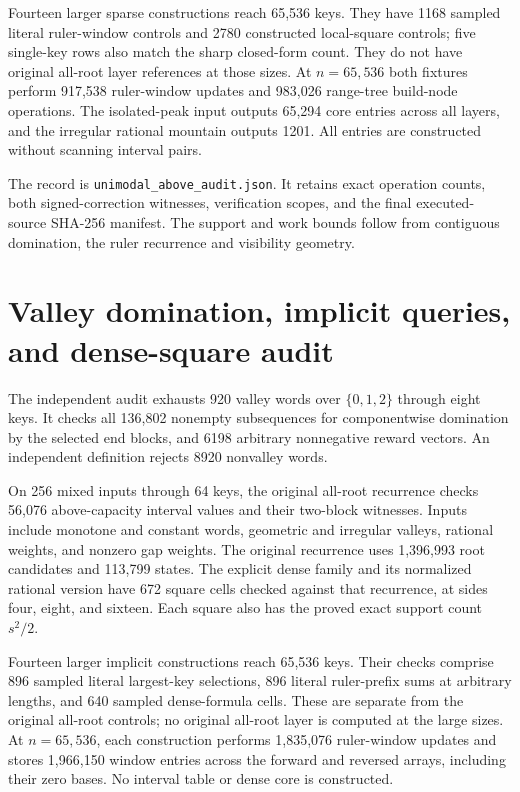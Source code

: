 \documentclass[11pt]{article}
\begin{document}
Fourteen larger sparse constructions reach 65,536 keys. They have 1168
sampled literal ruler-window controls and 2780 constructed local-square
controls; five single-key rows also match the sharp closed-form count.
They do not have original all-root layer references at those sizes.
At $n=65,536$ both fixtures perform 917,538 ruler-window updates and
983,026 range-tree build-node operations. The isolated-peak input outputs
65,294 core entries across all layers, and the irregular rational mountain
outputs 1201. All entries are constructed without scanning interval pairs.

The record is \texttt{unimodal\_above\_audit.json}. It retains exact operation
counts, both signed-correction witnesses, verification scopes, and the final
executed-source SHA-256 manifest. The support and work bounds follow from
contiguous domination, the ruler recurrence and visibility geometry.

\clearpage
\section{Valley domination, implicit queries, and dense-square audit}
\label{app:valley-audit}
The independent audit exhausts 920 valley words over $\{0,1,2\}$ through
eight keys. It checks all 136,802 nonempty subsequences for componentwise
domination by the selected end blocks, and 6198 arbitrary nonnegative
reward vectors. An independent definition rejects 8920 nonvalley words.

On 256 mixed inputs through 64 keys, the original all-root recurrence
checks 56,076 above-capacity interval values and their two-block witnesses.
Inputs include monotone and constant words, geometric and irregular valleys,
rational weights, and nonzero gap weights. The original recurrence uses
1,396,993 root candidates and 113,799 states. The explicit dense family
and its normalized rational version have 672 square cells checked against
that recurrence, at sides four, eight, and sixteen. Each square also has
the proved exact support count $s^2/2$.

Fourteen larger implicit constructions reach 65,536 keys. Their checks
comprise 896 sampled literal largest-key selections, 896 literal ruler-prefix
sums at arbitrary lengths, and 640 sampled dense-formula cells. These are
separate from the original all-root controls; no original all-root layer is
computed at the large sizes. At $n=65,536$, each construction performs
1,835,076 ruler-window updates and stores 1,966,150 window entries across
the forward and reversed arrays, including their zero bases. No interval
table or dense core is constructed.
\end{document}
